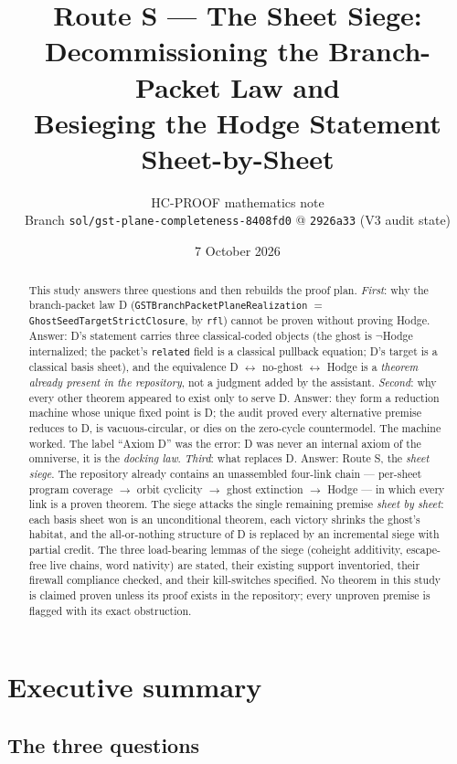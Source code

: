 \documentclass[11pt]{article}
\title{Route S --- The Sheet Siege:\\
Decommissioning the Branch-Packet Law and\\
Besieging the Hodge Statement Sheet-by-Sheet}
\author{HC-PROOF mathematics note\\
\small Branch \texttt{sol/gst-plane-completeness-8408fd0} @ \texttt{2926a33} (V3 audit state)}
\date{7 October 2026}
\renewcommand{\_}{\textunderscore\allowbreak}
\begin{document}
\maketitle

\begin{abstract}
This study answers three questions and then rebuilds the proof plan.
\emph{First}: why the branch-packet law D (\texttt{GSTBranchPacketPlaneRealization}
$=$ \texttt{GhostSeedTargetStrictClosure}, by \texttt{rfl}) cannot be proven without
proving Hodge. Answer: D's statement carries three classical-coded objects
(the ghost is $\neg$Hodge internalized; the packet's \texttt{related} field is a
classical pullback equation; D's target is a classical basis sheet), and the
equivalence D $\leftrightarrow$ no-ghost $\leftrightarrow$ Hodge is a \emph{theorem already
present in the repository}, not a judgment added by the assistant.
\emph{Second}: why every other theorem appeared to exist only to serve D. Answer:
they form a reduction machine whose unique fixed point is D; the audit proved
every alternative premise reduces to D, is vacuous-circular, or dies on the
zero-cycle countermodel. The machine worked. The label ``Axiom D'' was the error:
D was never an internal axiom of the omniverse, it is the \emph{docking law}.
\emph{Third}: what replaces D. Answer: Route S, the \emph{sheet siege}. The
repository already contains an unassembled four-link chain
--- per-sheet program coverage $\to$ orbit cyclicity $\to$ ghost extinction
$\to$ Hodge --- in which every link is a proven theorem. The siege attacks the
single remaining premise \emph{sheet by sheet}: each basis sheet won is an
unconditional theorem, each victory shrinks the ghost's habitat, and the
all-or-nothing structure of D is replaced by an incremental siege with partial
credit. The three load-bearing lemmas of the siege (coheight additivity,
escape-free live chains, word nativity) are stated, their existing support
inventoried, their firewall compliance checked, and their kill-switches
specified. No theorem in this study is claimed proven unless its proof exists
in the repository; every unproven premise is flagged with its exact obstruction.
\end{abstract}

\tableofcontents

\section{Executive summary}\label{sec:summary}

\subsection{The three questions}
\end{document}
